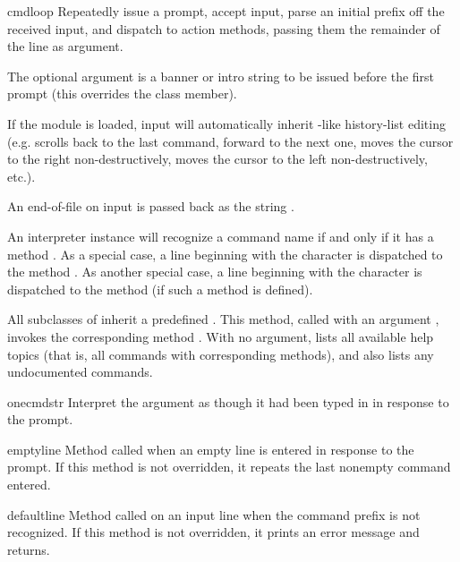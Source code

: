 \begin{methoddesc}{cmdloop}{}
Repeatedly issue a prompt, accept input, parse an initial prefix off
the received input, and dispatch to action methods, passing them the
remainder of the line as argument.

The optional argument is a banner or intro string to be issued before the
first prompt (this overrides the  class member).

If the  module is loaded, input will automatically
inherit -like history-list editing (e.g. 
scrolls back to the last command,  forward to the next
one,  moves the cursor to the right non-destructively,
 moves the cursor to the left non-destructively, etc.).

An end-of-file on input is passed back as the string .

An interpreter instance will recognize a command name  if
and only if it has a method .  As a special case,
a line beginning with the character  is dispatched to
the method .  As another special case, a line
beginning with the character \character{!} is dispatched to the
method  (if such a method is defined).

All subclasses of  inherit a predefined .
This method, called with an argument , invokes the
corresponding method .  With no argument,
 lists all available help topics (that is, all
commands with corresponding  methods), and also lists
any undocumented commands.
\end{methoddesc}

\begin{methoddesc}{onecmd}{str}
Interpret the argument as though it had been typed in in
response to the prompt.
\end{methoddesc}

\begin{methoddesc}{emptyline}{}
Method called when an empty line is entered in response to the prompt.
If this method is not overridden, it repeats the last nonempty command
entered.  
\end{methoddesc}

\begin{methoddesc}{default}{line}
Method called on an input line when the command prefix is not
recognized. If this method is not overridden, it prints an
error message and returns.
\end{methoddesc}

